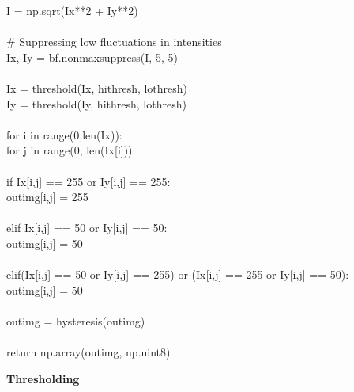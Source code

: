 \documentclass{article}
\begin{document}
	\indent I = np.sqrt(I\textunderscore x**2 + I\textunderscore y**2)\\
	\\
	\indent \# Suppressing low fluctuations in intensities\\
	\indent I\textunderscore x, I\textunderscore y = bf.non\textunderscore max\textunderscore suppress(I, 5, 5)\\
	\\
	\indent I\textunderscore x = threshold(I\textunderscore x, hi\textunderscore thresh, lo\textunderscore thresh)\\
	\indent I\textunderscore y = threshold(I\textunderscore y, hi\textunderscore thresh, lo\textunderscore thresh)\\
	\\
	\indent for i in range(0,len(I\textunderscore x)):\\
	\indent \indent for j in range(0, len(I\textunderscore x[i])):\\
	\\
	\indent \indent \indent if I\textunderscore x[i,j] == 255 or I\textunderscore y[i,j] == 255:\\
	\indent \indent \indent \indent out\textunderscore img[i,j] = 255\\
	\\
	\indent \indent \indent elif I\textunderscore x[i,j] == 50 or I\textunderscore y[i,j] == 50:\\
	\indent \indent \indent \indent out\textunderscore img[i,j] = 50\\
	\\
	\indent \indent \indent elif(I\textunderscore x[i,j] == 50 or I\textunderscore y[i,j] == 255) or (I\textunderscore x[i,j] == 255 or I\textunderscore y[i,j] == 50):\\
	\indent \indent \indent \indent out\textunderscore img[i,j] = 50\\
	\\
	\indent out\textunderscore img = hysteresis(out\textunderscore img)\\
	\\
	\indent return np.array(out\textunderscore img, np.uint8)\\
	
	\smallskip
	
	\noindent \textbf{Thresholding}
	
	\smallskip
	
\end{document}
